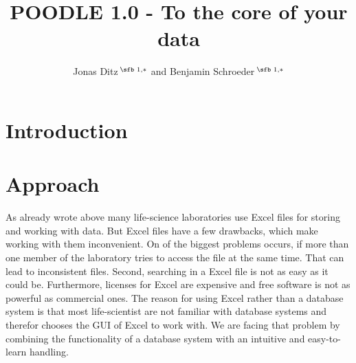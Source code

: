 \documentclass{bioinfo}
\begin{document}

\subtitle{}%

\title[POODLE]{POODLE 1.0 - To the core of your data}
\author[Ditz, Schroeder]{Jonas Ditz\,$^{\text{\sfb 1,}*}$ and Benjamin Schroeder\,$^{\text{\sfb 1,}*}$} 
\address{$^{\text{\sf 1}}$Department of Informatics, Eberhard Karls University, T\"ubingen, 72076, Germany.}


\history{}%

\editor{}%


\maketitle

\section{Introduction}


\enlargethispage{12pt}

\section{Approach}

As already wrote above many life-science laboratories use Excel files for storing and working with 
data. But Excel files have a few drawbacks, which make working with them inconvenient. On of the 
biggest problems occurs, if more than one member of the laboratory tries to access the file at the 
same time. That can lead to inconsistent files. Second, searching in a Excel file is not as easy as 
it could be. Furthermore, licenses for Excel are expensive and free software is not as powerful as 
commercial ones. The reason for using Excel rather than a database system is that most life-scientist 
are not familiar with database systems and therefor chooses the GUI of Excel to work with. We are 
facing that problem by combining the functionality of a database system with an intuitive and 
easy-to-learn handling.
\end{document}
